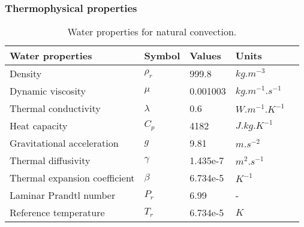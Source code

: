 \subsubsection*{Thermophysical properties}
\begin{table}[h!]
	\begin{tabular}{@{}lllll@{}}
		\toprule[1pt]
		\textbf{Water properties} & \textbf{Symbol} & \textbf{Values} & \textbf{Units} &  \\ \midrule[2pt]
		Density & $\rho_r$ & 999.8 & $kg.m^{-3}$ \\
		Dynamic viscosity & $\mu$ & 0.001003 & $kg.m^{-1}.s^{-1}$ \\
		Thermal conductivity & $\lambda$ & 0.6 & $W.m^{-1}.K^{-1}$ \\
		Heat capacity & $C_p$ & 4182 & $J.kg.K^{-1}$ \\		 
		Gravitational acceleration & $g$ &  9.81  & $m.s^{-2}$ \\
		Thermal diffusivity & $\gamma$ &  1.435e-7  & $m^{2}.s^{-1}$ \\		
		Thermal expansion coefficient & $\beta$ &  6.734e-5  & $K^{-1}$ \\	
		Laminar Prandtl number & $P_r$ &  6.99  & - \\
		Reference temperature & $T_r$ &  6.734e-5  & $K$ \\ \bottomrule[1pt]		
	\end{tabular}
	\centering
	\caption{Water properties for natural convection.}	
	\label{fig:waterProperties}
\end{table}

